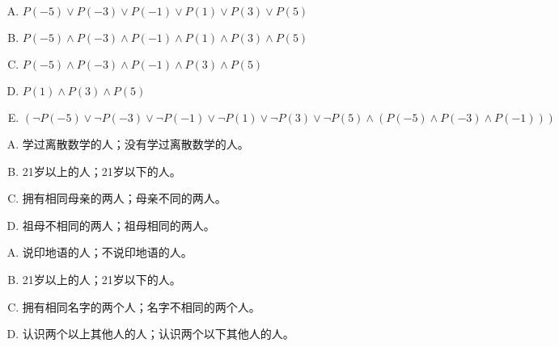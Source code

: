 {{        %
        \begin{practices}
            \begin{enumerate}[A.]
                \item $P(-5) \vee P(-3) \vee P(-1) \vee P(1) \vee P(3) \vee P(5)$
                \item $P(-5) \wedge P(-3) \wedge P(-1) \wedge P(1) \wedge P(3) \wedge P(5)$
                \item $P(-5) \wedge P(-3) \wedge P(-1) \wedge P(3) \wedge P(5)$
                \item $P(1) \wedge P(3) \wedge P(5)$
                \item $(\neg P(-5) \vee \neg P(-3) \vee \neg P(-1) \vee \neg P(1) \vee \neg P(3) \vee \neg P(5) \wedge (P(-5) \wedge P(-3) \wedge P(-1)))$
            \end{enumerate}
        \end{practices}

        \begin{practices}
            \begin{enumerate}[A.]
                \item 学过离散数学的人；没有学过离散数学的人。
                \item 21岁以上的人；21岁以下的人。
                \item 拥有相同母亲的两人；母亲不同的两人。
                \item 祖母不相同的两人；祖母相同的两人。
            \end{enumerate}
        \end{practices}

        \begin{practices}
            \begin{enumerate}[A.]
                \item 说印地语的人；不说印地语的人。
                \item 21岁以上的人；21岁以下的人。
                \item 拥有相同名字的两个人；名字不相同的两个人。
                \item 认识两个以上其他人的人；认识两个以下其他人的人。
            \end{enumerate}
        \end{practices}

}}
